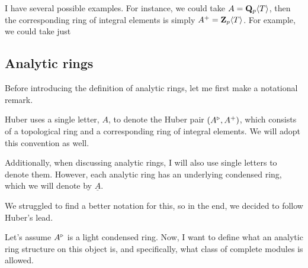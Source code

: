 \eex

I have several possible examples. For instance, we could take $A = \mathbf Q_p\langle T\rangle$, then the corresponding ring of integral elements is simply $A^+ = \mathbf Z_p\langle T \rangle$. For example, we could take just 


\subsection{Analytic rings}

Before introducing the definition of analytic rings, let me first make a notational remark.

\br
Huber uses a single letter, $A$, to denote the Huber pair $(A^\triangleright, A^{+})$, which  consists of a topological ring and a corresponding ring of integral elements. We will adopt this convention as well.

Additionally, when discussing analytic rings, I will also use single letters to denote them. 
However, each analytic ring has an underlying condensed ring, which we will denote by $\underline{A}$.

We struggled to find a better notation for this, so in the end, we decided to follow Huber's lead.
\er

Let's assume $A^\triangleright$ is a light condensed ring. Now, I want to define what an analytic ring structure on this object is, and specifically, what class of complete modules is allowed. 

